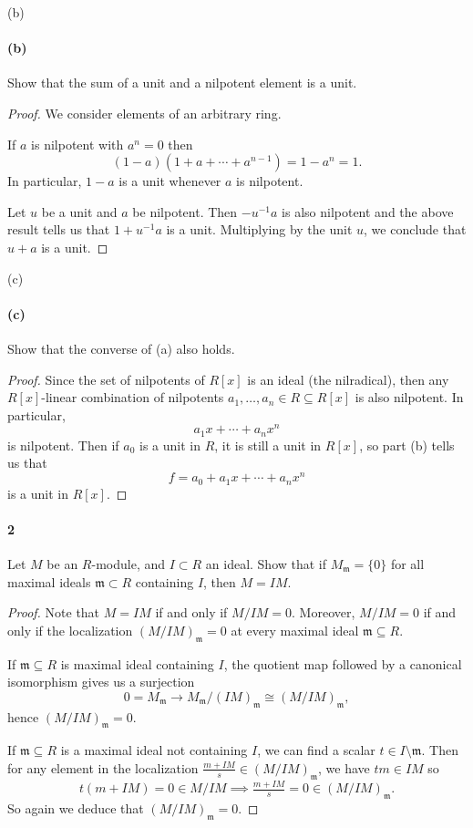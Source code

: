 \documentclass[12pt]{article}
\newlength{\myparskip}
\newenvironment{fullbox}{\begin{lrbox}{\savefullbox}\begin{minipage}{\dimexpr\textwidth-2\fboxsep\relax}\setlength{\parskip}{\myparskip}}{\end{minipage}\end{lrbox}\framebox[\textwidth]{\usebox{\savefullbox}}}
\newenvironment{pbox}[1][]{\begin{fullbox}\ifx#1\empty\else\paragraph{#1}\phantom{}\fi}{\end{fullbox}}
\theoremstyle{definition}
\newcommand{\<}{\langle}
\renewcommand{\>}{\rangle}
\newcommand{\isom}{\cong}
\newcommand{\seq}{\subseteq}
\newcommand{\mm}{\mathfrak{m}}
\newcommand{\To}{\longrightarrow}
\begin{document}
\begin{pbox}[(b)]
    Show that the sum of a unit and a nilpotent element is a unit.
\end{pbox}

\begin{proof}
    We consider elements of an arbitrary ring.

    If $a$ is nilpotent with $a^n = 0$ then
    \[
        (1 - a)(1 + a + \cdots + a^{n-1}) = 1 - a^n = 1.
    \]
    In particular, $1 - a$ is a unit whenever $a$ is nilpotent.

    Let $u$ be a unit and $a$ be nilpotent.
    Then $-u^{-1}a$ is also nilpotent and the above result tells us that $1 + u^{-1}a$ is a unit.
    Multiplying by the unit $u$, we conclude that $u + a$ is a unit.
\end{proof}



\begin{pbox}[(c)]
    Show that the converse of (a) also holds.
\end{pbox}

\begin{proof}
    Since the set of nilpotents of $R[x]$ is an ideal (the nilradical), then any $R[x]$-linear combination of nilpotents $a_1, \dots, a_n \in R \seq R[x]$ is also nilpotent.
    In particular,
    \[
        a_1x + \cdots + a_nx^n
    \]
    is nilpotent.
    Then if $a_0$ is a unit in $R$, it is still a unit in $R[x]$, so part (b) tells us that
    \[
        f = a_0 + a_1x + \cdots + a_nx^n
    \]
    is a unit in $R[x]$.
\end{proof}


\newpage
\begin{pbox}[2]
    Let $M$ be an $R$-module, and $I\subset R$ an ideal. Show that if $M_{\mathfrak{m}}=\{0\}$ for all maximal ideals $\mathfrak{m}\subset R$ containing $I$, then $M=IM$.
\end{pbox}

\begin{proof}
    Note that $M = IM$ if and only if $M/IM = 0$.
    Moreover, $M/IM = 0$ if and only if the localization $(M/IM)_\mm = 0$ at every maximal ideal $\mm \seq R$.

    If $\mm \seq R$ is maximal ideal containing $I$, the quotient map followed by a canonical isomorphism gives us a surjection
    \[
        0 = M_\mm \To M_\mm/(IM)_\mm \isom (M/IM)_\mm,
    \]
    hence $(M/IM)_\mm = 0$.

    If $\mm \seq R$ is a maximal ideal not containing $I$, we can find a scalar $t \in I \setminus \mm$.
    Then for any element in the localization $\frac{m + IM}{s} \in (M/IM)_\mm$, we have $tm \in IM$ so
    \[
        t(m + IM) = 0 \in M/IM \implies \tfrac{m + IM}{s} = 0 \in (M/IM)_\mm.
    \]
    So again we deduce that $(M/IM)_\mm = 0$.
\end{proof}
\end{document}

